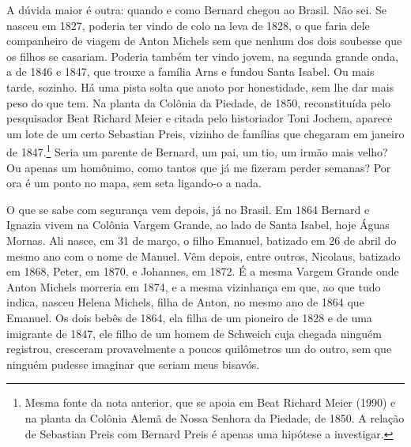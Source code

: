 \documentclass[
  brazilian,
  11pt,
  openany]{book}
\begin{document}
A dúvida maior é outra: quando e como Bernard chegou ao Brasil. Não sei.
Se nasceu em 1827, poderia ter vindo de colo na leva de 1828, o que
faria dele companheiro de viagem de Anton Michels sem que nenhum dos
dois soubesse que os filhos se casariam. Poderia também ter vindo jovem,
na segunda grande onda, a de 1846 e 1847, que trouxe a família Arns e
fundou Santa Isabel. Ou mais tarde, sozinho. Há uma pista solta que
anoto por honestidade, sem lhe dar mais peso do que tem. Na planta da
Colônia da Piedade, de 1850, reconstituída pelo pesquisador Beat Richard
Meier e citada pelo historiador Toni Jochem, aparece um lote de um certo
Sebastian Preis, vizinho de famílias que chegaram em janeiro de
1847.\footnote{Mesma fonte da nota anterior, que se apoia em Beat
  Richard Meier (1990) e na planta da Colônia Alemã de Nossa Senhora da
  Piedade, de 1850. A relação de Sebastian Preis com Bernard Preis é
  apenas uma hipótese a investigar.} Seria um parente de Bernard, um
pai, um tio, um irmão mais velho? Ou apenas um homônimo, como tantos que
já me fizeram perder semanas? Por ora é um ponto no mapa, sem seta
ligando-o a nada.

O que se sabe com segurança vem depois, já no Brasil. Em 1864 Bernard e
Ignazia vivem na Colônia Vargem Grande, ao lado de Santa Isabel, hoje
Águas Mornas. Ali nasce, em 31 de março, o filho Emanuel, batizado em 26
de abril do mesmo ano com o nome de Manuel. Vêm depois, entre outros,
Nicolaus, batizado em 1868, Peter, em 1870, e Johannes, em 1872. É a
mesma Vargem Grande onde Anton Michels morreria em 1874, e a mesma
vizinhança em que, ao que tudo indica, nasceu Helena Michels, filha de
Anton, no mesmo ano de 1864 que Emanuel. Os dois bebês de 1864, ela
filha de um pioneiro de 1828 e de uma imigrante de 1847, ele filho de um
homem de Schweich cuja chegada ninguém registrou, cresceram
provavelmente a poucos quilômetros um do outro, sem que ninguém pudesse
imaginar que seriam meus bisavós.
\end{document}
